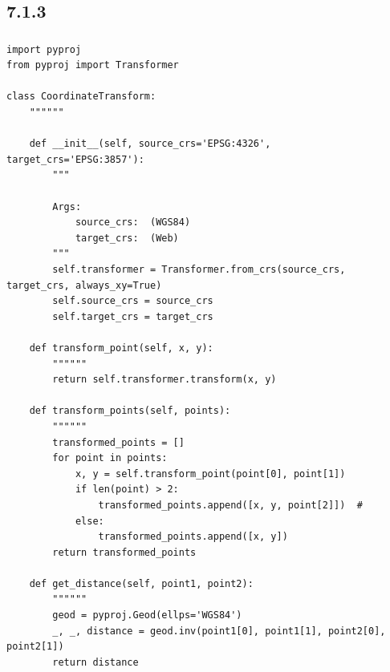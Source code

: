 \hypertarget{section-37}{%
\subsection{7.1.3}\label{section-37}}

\hypertarget{section-38}{%
\subsubsection{}\label{section-38}}

\begin{lstlisting}[style=python]
import pyproj
from pyproj import Transformer

class CoordinateTransform:
    """"""
    
    def __init__(self, source_crs='EPSG:4326', target_crs='EPSG:3857'):
        """

        Args:
            source_crs:  (WGS84)
            target_crs:  (Web)
        """
        self.transformer = Transformer.from_crs(source_crs, target_crs, always_xy=True)
        self.source_crs = source_crs
        self.target_crs = target_crs
    
    def transform_point(self, x, y):
        """"""
        return self.transformer.transform(x, y)
    
    def transform_points(self, points):
        """"""
        transformed_points = []
        for point in points:
            x, y = self.transform_point(point[0], point[1])
            if len(point) > 2:
                transformed_points.append([x, y, point[2]])  # 
            else:
                transformed_points.append([x, y])
        return transformed_points
    
    def get_distance(self, point1, point2):
        """"""
        geod = pyproj.Geod(ellps='WGS84')
        _, _, distance = geod.inv(point1[0], point1[1], point2[0], point2[1])
        return distance
\end{lstlisting}

\hypertarget{section-39}{%
\subsubsection{}\label{section-39}}


